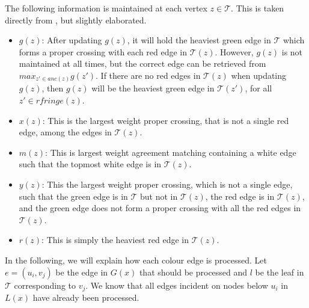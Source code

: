 The following information is maintained at each vertex $z \in \mathcal{T}$. This is taken directly from , but slightly elaborated.
\begin{itemize}
	\item $g(z)$: After updating $g(z)$, it will hold the heaviest green edge in $\mathcal{T}$ which	forms a proper crossing with each red edge in $\mathcal{T}(z)$.
	\subitem However, $g(z)$ is not maintained at all times, but the correct edge can be retrieved from $max_{z' \in anc(z)}g(z')$.
	\subitem If there are no red edges in $\mathcal{T}(z)$ when updating $g(z)$, then $g(z)$ will be the heaviest green edge in $\mathcal{T}(z')$, for all $z' \in rfringe(z)$.
	\item $x(z)$: This is the largest weight proper crossing, that is not a single red edge, among the edges in $\mathcal{T}(z)$.
	\item $m(z)$: This is largest weight agreement matching containing a white edge
	such that the topmost white edge is in $\mathcal{T}(z)$.
	\item $y(z)$: This the largest weight proper crossing, which is not a single edge, such that the green edge is in $\mathcal{T}$ but not in $\mathcal{T}(z)$, the red edge is in $\mathcal{T}(z)$, and the green edge does not form a proper crossing with all the red edges in $\mathcal{T}(z)$.
	\item $r(z)$: This is simply the heaviest red edge in $\mathcal{T}(z)$.
\end{itemize}

In the following, we will explain how each colour edge is processed. Let $e=(u_i,v_j)$ be the edge in $G(x)$ that should be processed and $l$ be the leaf in $\mathcal{T}$ corresponding to $v_j$. We know that all edges incident on nodes below $u_i$ in $L(x)$ have already been processed.

